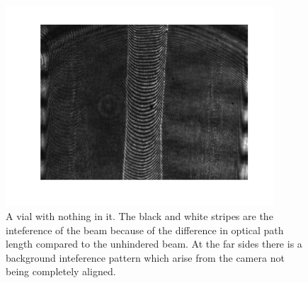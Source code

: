 \begin {figure}[ht!]
\includegraphics [width=10cm]{bilder/sample.png}
\caption {A vial with nothing in it. The black and white stripes are the inteference %
          of the beam because of the difference in optical path length compared to the %
          unhindered beam. At the far sides there is a background inteference pattern %
          which arise from the camera not being completely aligned.}
\end {figure}

